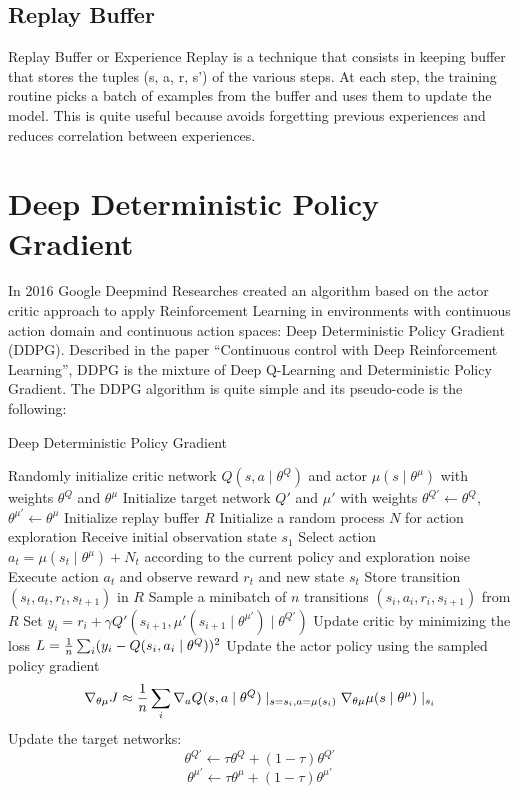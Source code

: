 \documentclass[binding=0.6cm,Lau,oneside]{sapthesis} %
\begin{document}
\section{Replay Buffer}
Replay Buffer or Experience Replay is a technique that consists in keeping buffer that stores the tuples (s, a, r, s’) of the various steps. \newline
At each step, the training routine picks a batch of examples from the buffer and uses them to update the model. This is quite useful because avoids forgetting previous experiences and reduces correlation between experiences.


\chapter{Deep Deterministic Policy Gradient}
\label{DDPG}
In 2016 Google Deepmind Researches created an algorithm based on the actor critic approach to apply Reinforcement Learning in environments with continuous action domain and continuous action spaces: Deep Deterministic Policy Gradient (DDPG).\newline
Described in the paper “Continuous control with Deep Reinforcement Learning”, DDPG is the mixture of Deep Q-Learning and Deterministic Policy Gradient.\newline
The DDPG algorithm is quite simple and its pseudo-code is the following:
\begin{algorithm}[H]
    \caption{Deep Deterministic Policy Gradient}
\begin{algorithmic}[0]
\STATE Randomly initialize critic network $Q(s,a\mid\theta^Q)$ and actor $\mu(s\mid\theta^\mu)$ with weights $\theta^Q$ and $\theta^\mu$
\STATE Initialize target network $Q'$ and $\mu'$ with weights $\theta^{Q'} \gets \theta^{Q}$, $\theta^{\mu'} \gets \theta^{\mu}$
\STATE Initialize replay buffer $R$
    \STATE Initialize a random process $N$ for action exploration
    \STATE Receive initial observation state $s_1$
        \STATE Select action $a_t=\mu(s_t \mid \theta^\mu) + N_t$ according to the current policy and exploration noise
       	\STATE Execute action $a_t$ and observe reward $r_t$ and new state $s_t$
        \STATE Store transition $(s_t, a_t, r_t, s_{t+1})$ in $R$
        \STATE Sample a minibatch of $n$ transitions $(s_i, a_i, r_i, s_{i+1})$ from $R$
        \STATE Set $y_i = r_i + \gamma Q'(s_{i+1}, \mu'(s_{i+1} \mid \theta^{\mu'})\mid \theta^{Q'})$
        \STATE Update critic by minimizing the loss $L={1 \over n} \sum_i (y_i - Q(s_i, a_i \mid \theta^Q))^2$
        \STATE Update the actor policy using the sampled policy gradient $$ \nabla_{\theta \mu}J \approx {1 \over n} \sum_i \nabla_a Q(s,a \mid \theta^Q) \mid_{s=s_i, a=\mu(s_i)} \nabla_{\theta \mu} \mu(s \mid \theta^\mu) \mid_{s_i}$$
        \STATE Update the target networks: $$\theta^{Q'} \gets \tau \theta^{Q} + (1-\tau)\theta^{Q'}$$ $$\theta^{\mu'} \gets \tau \theta^{\mu} + (1-\tau)\theta^{\mu'}$$
    \ENDFOR
\ENDFOR
\end{algorithmic}
\end{algorithm}
\end{document}
